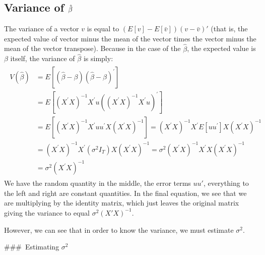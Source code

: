 \documentclass[letterpaper,10pt,english]{jupyterBook}
\begin{document}
\subsection{Variance of \protect\(\hat\beta\protect\)}
\label{\detokenize{parts/econometric-theory/linearmodels:variance-of-hat-beta}}
The variance of a vector \(v\) is equal to \((E[v] - E[\bar v])(v - \bar v)'\) (that is, the expected value of vector minus the mean
of the vector times the vector minus the mean of the vector transpose).
Because in the case of the \(\hat\beta\), the expected value is \(\beta\)
itself, the variance of \(\hat\beta\) is simply:
\begin{equation*}
\begin{split}
\begin{aligned}
V(\hat{\beta}) &=E\left[(\hat{\beta}-\beta)(\hat{\beta}-\beta)^{\prime}\right] \\
&=E\left[\left(X^{\prime} X\right)^{-1} X^{\prime} u\left(\left(X^{\prime} X\right)^{-1} X^{\prime} u\right)^{\prime}\right] \\
&=E\left[\left(X^{\prime} X\right)^{-1} X^{\prime} u u^{\prime} X\left(X^{\prime} X\right)^{-1}\right]=\left(X^{\prime} X\right)^{-1} X^{\prime} E\left[u u^{\prime}\right] X\left(X^{\prime} X\right)^{-1} \\
&=\left(X^{\prime} X\right)^{-1} X^{\prime}\left(\sigma^{2} I_{T}\right) X\left(X^{\prime} X\right)^{-1}=\sigma^{2}\left(X^{\prime} X\right)^{-1} X^{\prime} X\left(X^{\prime} X\right)^{-1} \\
&=\sigma^{2}\left(X^{\prime} X\right)^{-1}
\end{aligned}
\end{split}
\end{equation*}
We have the random quantity in the middle, the error terms \(uu'\),
everything to the left and right are constant quantities. In the final
equation, we see that we are multiplying by the identity matrix, which
just leaves the original matrix giving the variance to equal
\(\sigma^2(X'X)^{-1}\).

However, we can see that in order to know the variance, we must estimate \(\sigma^2\).

\#\#\# Estimating \(\sigma^2\)
\end{document}
